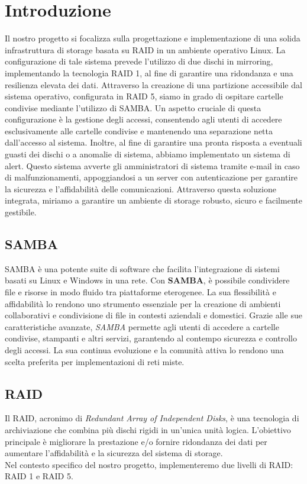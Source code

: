 \documentclass[11pt]{article}
\begin{document}
\section{Introduzione}
Il nostro progetto si focalizza sulla progettazione e implementazione di una solida infrastruttura di storage basata su RAID in un ambiente operativo Linux. La configurazione di tale sistema prevede l'utilizzo di due dischi in mirroring, implementando la tecnologia RAID 1, al fine di garantire una ridondanza e una resilienza elevata dei dati. Attraverso la creazione di una partizione accessibile dal sistema operativo, configurata in RAID 5, siamo in grado di ospitare cartelle condivise mediante l'utilizzo di SAMBA. Un aspetto cruciale di questa configurazione è la gestione degli accessi, consentendo agli utenti di accedere esclusivamente alle cartelle condivise e mantenendo una separazione netta dall'accesso al sistema. Inoltre, al fine di garantire una pronta risposta a eventuali guasti dei dischi o a anomalie di sistema, abbiamo implementato un sistema di alert. Questo sistema avverte gli amministratori di sistema tramite e-mail in caso di malfunzionamenti, appoggiandosi a un server con autenticazione per garantire la sicurezza e l'affidabilità delle comunicazioni. Attraverso questa soluzione integrata, miriamo a garantire un ambiente di storage robusto, sicuro e facilmente gestibile.

\subsection{SAMBA}
SAMBA è una potente suite di software che facilita l'integrazione di sistemi basati su Linux e Windows in una rete. Con \textbf{SAMBA}, è possibile condividere file e risorse in modo fluido tra piattaforme eterogenee. La sua flessibilità e affidabilità lo rendono uno strumento essenziale per la creazione di ambienti collaborativi e condivisione di file in contesti aziendali e domestici. Grazie alle sue caratteristiche avanzate, \textit{SAMBA} permette agli utenti di accedere a cartelle condivise, stampanti e altri servizi, garantendo al contempo sicurezza e controllo degli accessi. La sua continua evoluzione e la comunità attiva lo rendono una scelta preferita per implementazioni di reti miste.

\subsection{RAID}
Il RAID, acronimo di \textit{Redundant Array of Independent Disks}, è una tecnologia di archiviazione che combina più dischi rigidi in un'unica unità logica. L'obiettivo principale è migliorare la prestazione e/o fornire ridondanza dei dati per aumentare l'affidabilità e la sicurezza del sistema di storage.
\\
Nel contesto specifico del nostro progetto, implementeremo due livelli di RAID: RAID 1 e RAID 5.
\end{document}
